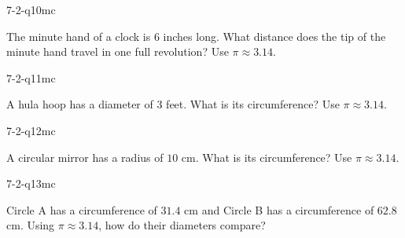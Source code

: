 \begin{practiceQuestion}{7-2-q10}{mc}
\begin{questionText}
The minute hand of a clock is $6$ inches long. What distance does the tip of the minute hand travel in one full revolution? Use $\pi \approx 3.14$.
\end{questionText}
\end{practiceQuestion}

\begin{practiceQuestion}{7-2-q11}{mc}
\begin{questionText}
A hula hoop has a diameter of $3$ feet. What is its circumference? Use $\pi \approx 3.14$.
\end{questionText}
\end{practiceQuestion}

\begin{practiceQuestion}{7-2-q12}{mc}
\begin{questionText}
A circular mirror has a radius of $10$ cm. What is its circumference? Use $\pi \approx 3.14$.
\end{questionText}
\end{practiceQuestion}

\begin{practiceQuestion}{7-2-q13}{mc}
\begin{questionText}
Circle A has a circumference of $31.4$ cm and Circle B has a circumference of $62.8$ cm. Using $\pi \approx 3.14$, how do their diameters compare?
\end{questionText}
\end{practiceQuestion}

